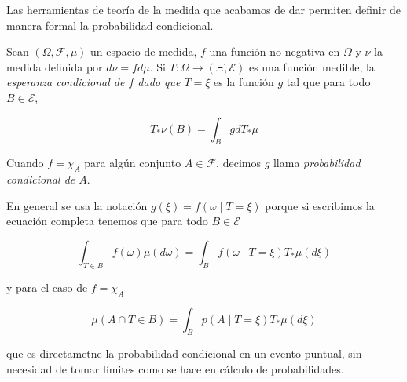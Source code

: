 \documentclass[main.tex]{subfiles}
\begin{document}
Las herramientas de teoría de la medida que acabamos de dar permiten definir de manera formal la probabilidad condicional.

\begin{definition}
Sean $(\Omega, \mathcal{F}, \mu)$ un espacio de medida, $f$ una función no negativa en $\Omega$  y $\nu$ la medida definida por $d\nu = fd\mu$. Si $T:\Omega \to (\Xi, \mathcal{E})$ es una función medible, la  \textit{esperanza condicional de $f$ dado que $T=\xi$} es la función $g$ tal que para todo $B\in\mathcal{E}$,

\begin{equation*}
	T_*\nu(B) = \int_B gdT_*\mu
\end{equation*}

Cuando $f=\chi_A$ para algún conjunto $A\in\mathcal{F}$, decimos $g$ llama \textit{probabilidad condicional de $A$}.
\end{definition}

En general se usa la notación $g(\xi) = f\left(\omega \mid T=\xi\right)$ porque si escribimos la ecuación completa tenemos que para todo $B\in\mathcal{E}$

\begin{equation*}
	\int_{T\in B} f(\omega)\mu(d\omega)
	= \int _B f(\omega \mid T=\xi)T_*\mu(d\xi)
\end{equation*}

y para el caso de $f=\chi_A$

\begin{equation*}
\mu\left(A\cap T\in B\right) = 
	\int _B p(A \mid T=\xi)T_*\mu(d\xi) 	
\end{equation*}

que es directametne la probabilidad condicional en un evento puntual, sin necesidad de tomar límites como se hace en cálculo de probabilidades.
\end{document}
